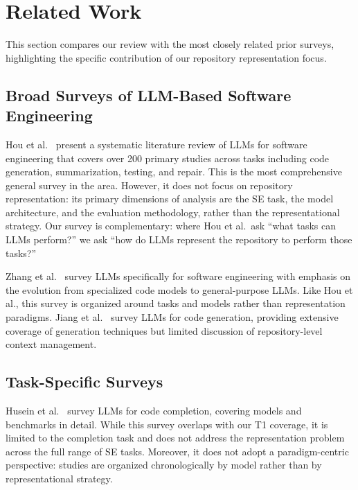 \section{Related Work}
\label{sec:relatedwork}

This section compares our review with the most closely related prior surveys, highlighting
the specific contribution of our repository representation focus.

\subsection{Broad Surveys of LLM-Based Software Engineering}

Hou et al.~\cite{hou2024llmse} present a systematic literature review of LLMs for software
engineering that covers over 200 primary studies across tasks including code generation,
summarization, testing, and repair. This is the most comprehensive general survey in the
area. However, it does not focus on repository representation: its primary dimensions of
analysis are the SE task, the model architecture, and the evaluation methodology, rather than
the representational strategy. Our survey is complementary: where Hou et al.\ ask ``what
tasks can LLMs perform?'' we ask ``how do LLMs represent the repository to perform those tasks?''

Zhang et al.~\cite{zhang2026survey} survey LLMs specifically for software engineering with
emphasis on the evolution from specialized code models to general-purpose LLMs. Like Hou et
al., this survey is organized around tasks and models rather than representation paradigms.
Jiang et al.~\cite{jiang2026survey} survey LLMs for code generation, providing extensive
coverage of generation techniques but limited discussion of repository-level context management.

\subsection{Task-Specific Surveys}

Husein et al.~\cite{husein2025codecompletion} survey LLMs for code completion, covering models
and benchmarks in detail. While this survey overlaps with our T1 coverage, it is limited to
the completion task and does not address the representation problem across the full range of SE
tasks. Moreover, it does not adopt a paradigm-centric perspective: studies are organized
chronologically by model rather than by representational strategy.

